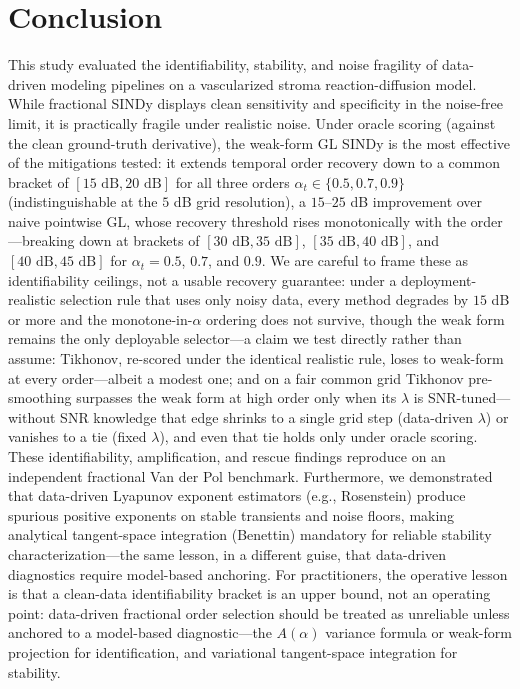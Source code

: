 \documentclass[review,3p,times]{elsarticle}
\begin{document}
\section{Conclusion}
This study evaluated the identifiability, stability, and noise fragility of data-driven modeling pipelines on a vascularized stroma reaction-diffusion model. While fractional SINDy displays clean sensitivity and specificity in the noise-free limit, it is practically fragile under realistic noise. Under oracle scoring (against the clean ground-truth derivative), the weak-form GL SINDy is the most effective of the mitigations tested: it extends temporal order recovery down to a common bracket of $[15\text{ dB}, 20\text{ dB}]$ for all three orders $\alpha_t \in \{0.5, 0.7, 0.9\}$ (indistinguishable at the $5$ dB grid resolution), a $15$--$25$ dB improvement over naive pointwise GL, whose recovery threshold rises monotonically with the order---breaking down at brackets of $[30\text{ dB}, 35\text{ dB}]$, $[35\text{ dB}, 40\text{ dB}]$, and $[40\text{ dB}, 45\text{ dB}]$ for $\alpha_t = 0.5$, $0.7$, and $0.9$. We are careful to frame these as identifiability ceilings, not a usable recovery guarantee: under a deployment-realistic selection rule that uses only noisy data, every method degrades by $15$ dB or more and the monotone-in-$\alpha$ ordering does not survive, though the weak form remains the only deployable selector---a claim we test directly rather than assume: Tikhonov, re-scored under the identical realistic rule, loses to weak-form at every order---albeit a modest one; and on a fair common grid Tikhonov pre-smoothing surpasses the weak form at high order only when its $\lambda$ is SNR-tuned---without SNR knowledge that edge shrinks to a single grid step (data-driven $\lambda$) or vanishes to a tie (fixed $\lambda$), and even that tie holds only under oracle scoring. These identifiability, amplification, and rescue findings reproduce on an independent fractional Van der Pol benchmark. Furthermore, we demonstrated that data-driven Lyapunov exponent estimators (e.g., Rosenstein) produce spurious positive exponents on stable transients and noise floors, making analytical tangent-space integration (Benettin) mandatory for reliable stability characterization---the same lesson, in a different guise, that data-driven diagnostics require model-based anchoring. For practitioners, the operative lesson is that a clean-data identifiability bracket is an upper bound, not an operating point: data-driven fractional order selection should be treated as unreliable unless anchored to a model-based diagnostic---the $A(\alpha)$ variance formula or weak-form projection for identification, and variational tangent-space integration for stability.
\end{document}
